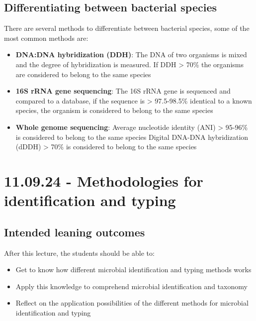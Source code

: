 \subsection{Differentiating between bacterial species}
There are several methods to differentiate between bacterial species, some of the most common methods are:

\begin{highlight}
    \begin{itemize}
        \item \textbf{DNA:DNA hybridization (DDH)}: 
        \subitem The DNA of two organisms is mixed and the degree of hybridization is measured. 
        \subitem If DDH > 70\% the organisms are considered to belong to the same species
        \item \textbf{16S rRNA gene sequencing}:
        \subitem The 16S rRNA gene is sequenced and compared to a database, if the sequence is > 97.5-98.5\% 
        \subitem identical to a known species, the organism is considered to belong to the same species
        \item \textbf{Whole genome sequencing}:
        \subitem Average nucleotide identity (ANI) > 95-96\% is considered to belong to the same species
        \subitem Digital DNA-DNA hybridization (dDDH) > 70\% is considered to belong to the same species
    \end{itemize}
\end{highlight}

\section{11.09.24 - Methodologies for identification and typing}

\subsection{Intended leaning outcomes}

After this lecture, the students should be able to:
\begin{highlight}
    \begin{itemize}
        \item Get to know how different microbial identification and typing methods works
        \item Apply this knowledge to comprehend microbial identification and taxonomy
        \item Reflect on the application possibilities of the different methods for microbial identification and typing
    \end{itemize}
\end{highlight}

